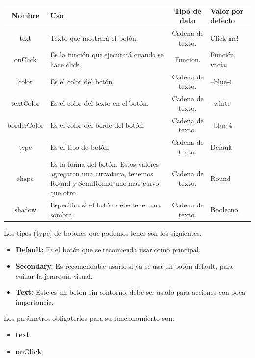 \newline
\newline
\begin{center}
 \begin{tabular}{ | c |  p{5cm}  | c | p{3cm} |} 
 \hline
 \textbf{Nombre} &  \textbf{Uso} &  \textbf{ Tipo de dato} &  \textbf{Valor por defecto}\\ [0.5ex] 
 \hline\hline
text & Texto que mostrará el botón.  &  Cadena de texto. & Click me! \\  [2.5ex] 
 \hline
onClick & Es la función que ejecutará cuando se hace click. & Funcion. & Función vacía. \\[2.5ex] 
 \hline
color &  Es el color del botón. & Cadena de texto. & --blue-4 \\[3.5ex] 
 \hline
 textColor & Es el color del texto en el botón. &  Cadena de texto. & --white \\[2.5ex] 
 \hline
borderColor & Es el color del borde del botón. & Cadena de texto. & --blue-4 \\ [2.5ex] 
 \hline
 type & Es el tipo de botón. & Cadena de texto. & Default \\ [2.5ex] 
 \hline
 shape & Es la forma del botón. Estos valores agregaran una curvatura, tenemos Round y SemiRound uno mas curvo que otro. & Cadena de texto. & Round \\ [2.5ex] 
 \hline
 shadow & Especifica si el botón debe tener una sombra. & Cadena de texto. & Booleano. \\ [2.5ex] 
 \hline
\end{tabular}
\end{center}
\newline
\newline
\newline
Los tipos (type) de botones que podemos tener son los siguientes.
\begin{itemize}
\item \textbf{Default:} Es el botón que se recomienda usar como principal.
\item \textbf{Secondary:} Es recomendable usarlo si ya se usa un botón default, para cuidar la jerarquía visual.
\item \textbf{Text:} Este es un botón sin contorno, debe ser usado para acciones con poca importancia.
\end{itemize}
\newline
Los parámetros obligatorios para su funcionamiento son:
\begin{itemize}
\item \textbf{text} 
\item \textbf{onClick} 
\end{itemize}
